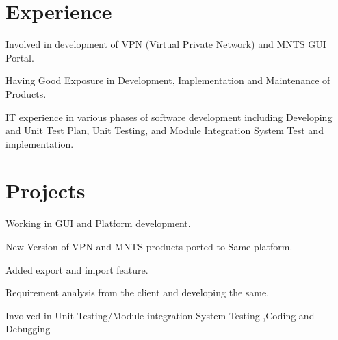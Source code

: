 \documentclass[]{prashant-resume-openfont}
\begin{document}
\hfill
\begin{minipage}[t]{0.66\textwidth} 


\section{Experience}

\vspace{\topsep} %
\begin{tightemize}\item Involved in development of  VPN (Virtual Private Network) and MNTS GUI Portal.\item Having Good Exposure in Development, Implementation and Maintenance of Products.\item IT experience in various phases of software development including Developing and Unit Test Plan, Unit Testing, and Module Integration System Test and implementation.
\end{tightemize}
\sectionsep


\section{Projects}

\begin{tightemize}\item Working in GUI and Platform development.\item New Version of VPN and MNTS products ported to Same platform.\item Added export and import feature.\item Requirement analysis from the client and developing the same. \item Involved in Unit Testing/Module integration System Testing ,Coding and Debugging

\end{tightemize} 

\sectionsep



\end{minipage}
\end{document}
